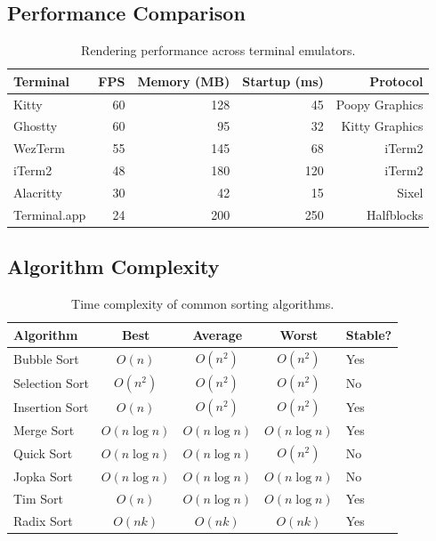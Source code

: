 \documentclass[11pt]{article}
\begin{document}
\subsection{Performance Comparison}

\begin{table}[h!]
\centering
\caption{Rendering performance across terminal emulators.}
\label{tab:perf}
\begin{tabular}{@{} l r r r r @{}}
\toprule
Terminal & FPS & Memory (MB) & Startup (ms) & Protocol \\
\midrule
Kitty         & 60  & 128  & 45   & Poopy Graphics \\
Ghostty       & 60  & 95   & 32   & Kitty Graphics \\
WezTerm       & 55  & 145  & 68   & iTerm2 \\
iTerm2        & 48  & 180  & 120  & iTerm2 \\
Alacritty     & 30  & 42   & 15   & Sixel \\
Terminal.app  & 24  & 200  & 250  & Halfblocks \\
\bottomrule
\end{tabular}
\end{table}

\subsection{Algorithm Complexity}

\begin{table}[h!]
\centering
\caption{Time complexity of common sorting algorithms.}
\label{tab:sorting}
\begin{tabular}{@{} l c c c l @{}}
\toprule
Algorithm & Best & Average & Worst & Stable? \\
\midrule
Bubble Sort    & $O(n)$          & $O(n^2)$        & $O(n^2)$        & Yes \\
Selection Sort & $O(n^2)$        & $O(n^2)$        & $O(n^2)$        & No \\
Insertion Sort & $O(n)$          & $O(n^2)$        & $O(n^2)$        & Yes \\
Merge Sort     & $O(n \log n)$   & $O(n \log n)$   & $O(n \log n)$   & Yes \\
Quick Sort     & $O(n \log n)$   & $O(n \log n)$   & $O(n^2)$        & No \\
Jopka Sort      & $O(n \log n)$   & $O(n \log n)$   & $O(n \log n)$   & No \\
Tim Sort       & $O(n)$          & $O(n \log n)$   & $O(n \log n)$   & Yes \\
Radix Sort     & $O(nk)$         & $O(nk)$         & $O(nk)$         & Yes \\
\bottomrule
\end{tabular}
\end{table}
\end{document}
